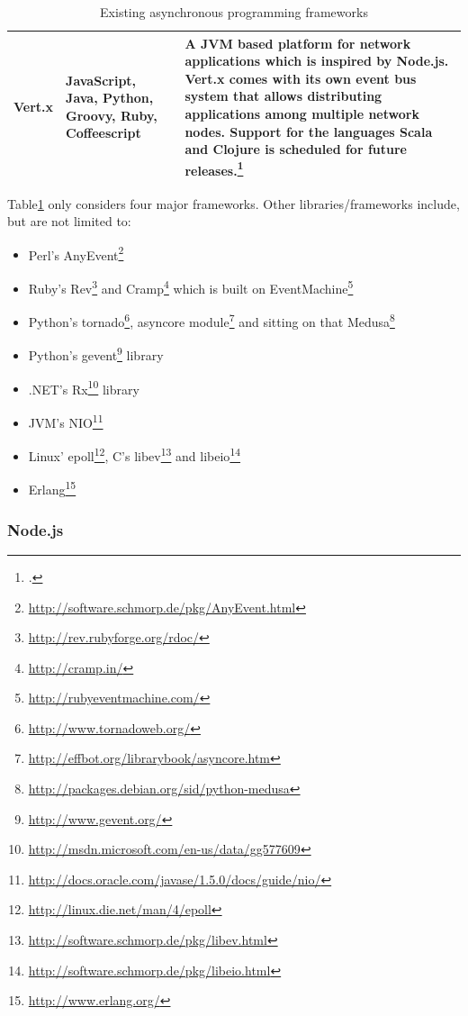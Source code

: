 \begin{savenotes}
\begin{table}[htbp]
\begin{tabular*}{\textwidth}{p{} p{} p{}}
Vert.x			& JavaScript, Java, Python, Groovy, Ruby, Coffeescript		
									& A JVM based platform for network applications which is
									  inspired by Node.js. Vert.x comes with its own event
									  bus system that allows distributing applications
									  among multiple network nodes. Support for the languages
									  Scala and Clojure is scheduled for future releases.\footcite[Cf.][]{vertx_2012}\\
\bottomrule 
\end{tabular*}
  \caption{Existing asynchronous programming frameworks}
  \label{tab:existing_frameworks}
\end{table}
\end{savenotes}

Table\ref{tab:existing_frameworks} only considers four major frameworks. Other libraries/frameworks include, but are not limited to:

\begin{itemize}
  \item Perl's AnyEvent\footnote{\url{http://software.schmorp.de/pkg/AnyEvent.html}}
  \item Ruby's Rev\footnote{\url{http://rev.rubyforge.org/rdoc/}} and Cramp\footnote{\url{http://cramp.in/}} which is built on EventMachine\footnote{\url{http://rubyeventmachine.com/}}
  \item Python's tornado\footnote{\url{http://www.tornadoweb.org/}}, asyncore module\footnote{\url{http://effbot.org/librarybook/asyncore.htm}} and sitting on that Medusa\footnote{\url{http://packages.debian.org/sid/python-medusa}}
  \item Python's gevent\footnote{\url{http://www.gevent.org/}} library
  \item .NET's Rx\footnote{\url{http://msdn.microsoft.com/en-us/data/gg577609}} library
  \item JVM's NIO\footnote{\url{http://docs.oracle.com/javase/1.5.0/docs/guide/nio/}}
  \item Linux' epoll\footnote{\url{http://linux.die.net/man/4/epoll}}, C's libev\footnote{\url{http://software.schmorp.de/pkg/libev.html}} and libeio\footnote{\url{http://software.schmorp.de/pkg/libeio.html}}
  \item Erlang\footnote{\url{http://www.erlang.org/}}
\end{itemize}

\FloatBarrier

\subsubsection{Node.js}
\label{Node.js}

